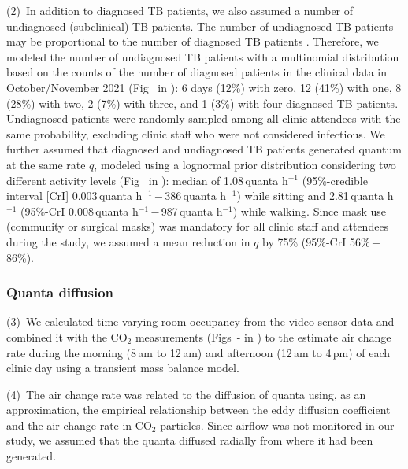\documentclass[fleqn,11pt]{wlscirep}
\begin{document}
(2)~In addition to diagnosed TB patients, we also assumed a number of undiagnosed (subclinical) TB patients. The number of undiagnosed TB patients may be proportional to the number of diagnosed TB patients \cite{Berhanu2023CID,Moyo2022LancetID,Patterson2024PNAS}. Therefore, we modeled the number of undiagnosed TB patients with a multinomial distribution based on the counts of the number of diagnosed patients in the clinical data in October/November 2021 (Fig~ in \supp): 6 days (12\%) with zero, 12 (41\%) with one, 8 (28\%) with two, 2 (7\%) with three, and 1 (3\%) with four diagnosed TB patients. Undiagnosed patients were randomly sampled among all clinic attendees with the same probability, excluding clinic staff who were not considered infectious. We further assumed that diagnosed and undiagnosed TB patients generated quantum at the same rate $q$, modeled using a lognormal prior distribution considering two different activity levels (Fig~ in \supp): median of 1.08\,quanta h$^{-1}$ (95\%-credible interval [CrI] 0.003\,quanta h$^{-1}$\,$-$\,386\,quanta h$^{-1}$) while sitting and 2.81\,quanta h$^{-1}$ (95\%-CrI 0.008\,quanta h$^{-1}$\,$-$\,987\,quanta h$^{-1}$) while walking\cite{Mikszewski2021GF,Buonanno2020EI,Banholzer2024PGPH}. Since mask use (community or surgical masks) was mandatory for all clinic staff and attendees during the study, we assumed a mean reduction in $q$ by 75\% (95\%-CrI 56\%\,$-$\,86\%)\cite{Dharmadhikari2012AJRCCM,McCreesh2021BMJGlobalHealth}.

\subsubsection*{Quanta diffusion}

(3)~We calculated time-varying room occupancy from the video sensor data and combined it with the CO$_2$ measurements (Figs~- in \supp) to the estimate air change rate during the morning (8\,am to 12\,am) and afternoon (12\,am to 4\,pm) of each clinic day using a transient mass balance model\cite{Batterman2017IJERPH}. 

(4)~The air change rate was related to the diffusion of quanta using, as an approximation, the empirical relationship between the eddy diffusion coefficient and the air change rate in CO$_2$ particles\cite{Cheng2011EnvSciTech,Foat2020BE}. Since airflow was not monitored in our study, we assumed that the quanta diffused radially from where it had been generated. 
\end{document}
